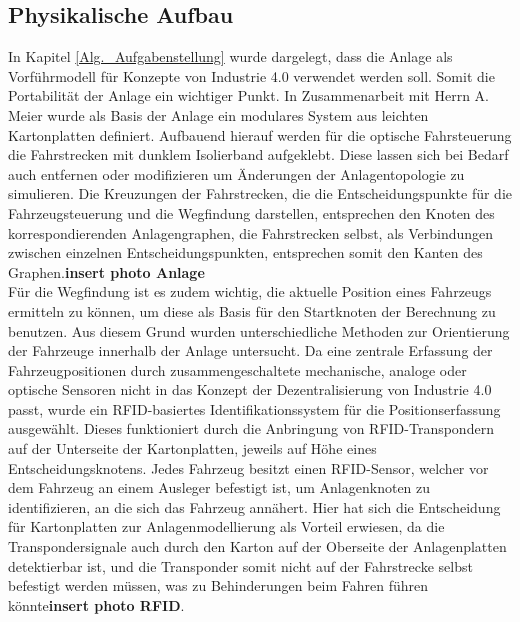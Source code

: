 		\subsection{Physikalische Aufbau}
			\label{Phys_Anlage}
			In Kapitel \ref{Alg._Aufgabenstellung} wurde dargelegt, dass die Anlage als Vorführmodell für Konzepte von Industrie 4.0  verwendet werden soll. Somit die Portabilität der Anlage ein wichtiger Punkt. In Zusammenarbeit mit Herrn A. Meier wurde als Basis der Anlage ein modulares System aus leichten Kartonplatten definiert. Aufbauend hierauf werden für die optische Fahrsteuerung die Fahrstrecken mit dunklem Isolierband aufgeklebt. Diese lassen sich bei Bedarf auch entfernen oder modifizieren um Änderungen der Anlagentopologie zu simulieren. Die Kreuzungen der Fahrstrecken, die die Entscheidungspunkte für die Fahrzeugsteuerung und die Wegfindung darstellen, entsprechen den Knoten des korrespondierenden Anlagengraphen, die Fahrstrecken selbst, als Verbindungen zwischen einzelnen Entscheidungspunkten, entsprechen somit den Kanten des Graphen.\textbf{insert photo Anlage}\\
			
			Für die Wegfindung ist es zudem wichtig, die aktuelle Position eines Fahrzeugs ermitteln zu können, um diese als Basis für den Startknoten der Berechnung zu benutzen. Aus diesem Grund wurden unterschiedliche Methoden zur Orientierung der Fahrzeuge innerhalb der Anlage untersucht. Da eine zentrale Erfassung der Fahrzeugpositionen durch zusammengeschaltete mechanische, analoge oder optische Sensoren nicht in das Konzept der Dezentralisierung von Industrie 4.0 passt, wurde ein \ac{RFID}-basiertes Identifikationssystem für die Positionserfassung ausgewählt. Dieses funktioniert durch die Anbringung von \ac{RFID}-Transpondern auf der Unterseite der Kartonplatten, jeweils auf Höhe eines Entscheidungsknotens. Jedes Fahrzeug besitzt einen \ac{RFID}-Sensor, welcher vor dem Fahrzeug an einem Ausleger befestigt ist, um Anlagenknoten zu identifizieren, an die sich das Fahrzeug annähert. Hier hat sich die Entscheidung für Kartonplatten zur Anlagenmodellierung als Vorteil erwiesen, da die Transpondersignale auch durch den Karton auf der Oberseite der Anlagenplatten detektierbar ist, und die Transponder somit nicht auf der Fahrstrecke selbst befestigt werden müssen, was zu Behinderungen beim Fahren führen könnte\textbf{insert photo RFID}.
			
